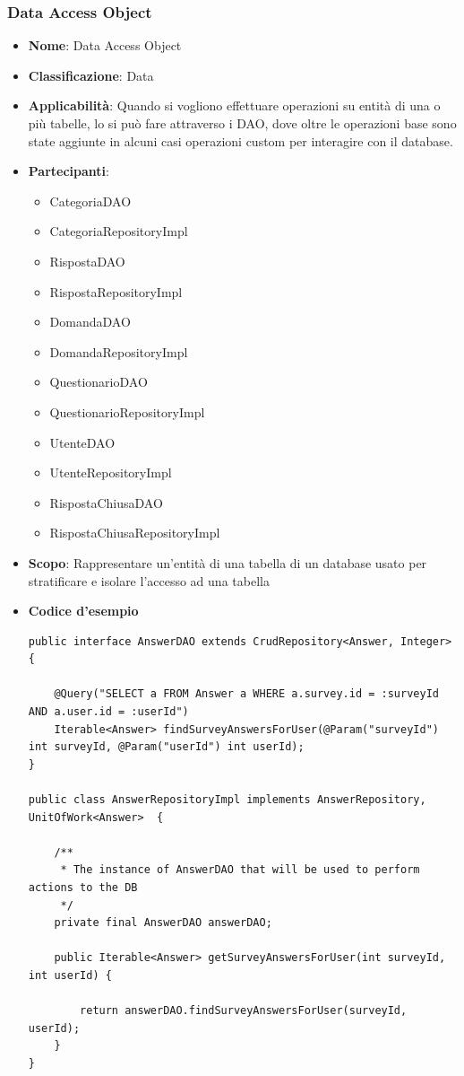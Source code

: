 \documentclass[12pt]{article}
\begin{document}
		\subsubsection{Data Access Object}
		\begin{itemize}
		\item \textbf{Nome}: Data Access Object
            \item \textbf{Classificazione}: Data
            \item \textbf{Applicabilità}: Quando si vogliono effettuare operazioni su entità di una o più tabelle, lo si può fare attraverso i DAO, dove oltre le operazioni base sono state aggiunte in alcuni casi operazioni custom per interagire con il database.
            \item \textbf{Partecipanti}:
                \begin{itemize}
                    \item CategoriaDAO
                    \item CategoriaRepositoryImpl
                    \item RispostaDAO
                    \item RispostaRepositoryImpl
                    \item DomandaDAO
                    \item DomandaRepositoryImpl
                    \item QuestionarioDAO
                    \item QuestionarioRepositoryImpl
                    \item UtenteDAO
                    \item UtenteRepositoryImpl
                    \item RispostaChiusaDAO
                    \item RispostaChiusaRepositoryImpl
                \end{itemize}
            \item \textbf{Scopo}: Rappresentare un'entità di una tabella di un database usato per stratificare e isolare l'accesso ad una tabella
            \item \textbf{Codice d'esempio}
            \begin{lstlisting}
public interface AnswerDAO extends CrudRepository<Answer, Integer> {

	@Query("SELECT a FROM Answer a WHERE a.survey.id = :surveyId AND a.user.id = :userId")
	Iterable<Answer> findSurveyAnswersForUser(@Param("surveyId") int surveyId, @Param("userId") int userId);
}

public class AnswerRepositoryImpl implements AnswerRepository, UnitOfWork<Answer>  {

	/**
	 * The instance of AnswerDAO that will be used to perform actions to the DB
	 */
	private final AnswerDAO answerDAO;
	
	public Iterable<Answer> getSurveyAnswersForUser(int surveyId, int userId) {
	
		return answerDAO.findSurveyAnswersForUser(surveyId, userId);
    }
}
            \end{lstlisting}
        \end{itemize}
		
\end{document}
